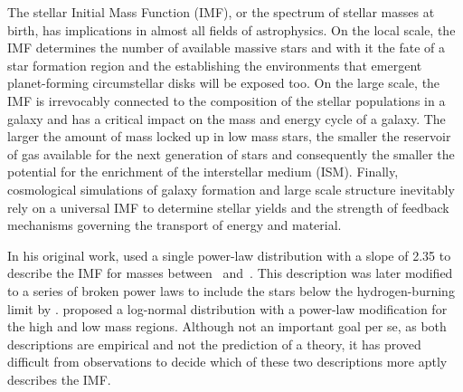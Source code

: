 The stellar Initial Mass Function (IMF), or the spectrum of stellar masses at birth,  has implications in almost all fields of astrophysics.  
On the local scale, the IMF determines the number of available massive stars and with it the fate of a star formation region and the establishing the environments that emergent planet-forming circumstellar disks will be exposed too. 
On the large scale, the IMF is irrevocably connected to the composition of the stellar populations in a galaxy and has a critical impact on the mass and energy cycle of a galaxy. 
The larger the amount of mass locked up in low mass stars, the smaller the reservoir of gas available for the next generation of stars and consequently the smaller the potential for the enrichment of the interstellar medium (ISM). 
Finally, cosmological simulations of galaxy formation and large scale structure inevitably rely on a universal IMF to determine stellar yields and the strength of feedback mechanisms governing the transport of energy and material. %


In his original work, \citet{salpeter1955} used a single power-law distribution with a slope of 2.35 to describe the IMF for masses between \ and \,\msun . This description was later modified to a series of broken power laws to include the stars below the hydrogen-burning limit by \citet{kroupa2001}. \citet{chabrier2005} proposed a log-normal distribution with a power-law modification for the high and low mass regions. Although not an important goal per se, as both descriptions are empirical and not the prediction of a theory, it has proved difficult from observations to decide which of these two descriptions more aptly describes the IMF.

